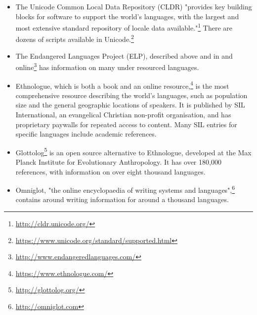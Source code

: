 \begin{itemize}
\item The Unicode Common Local Data Repository (CLDR) "provides key building blocks for software to support the world's languages, with the largest and most extensive standard repository of locale data available."\footnote{\href{http://cldr.unicode.org/}{http://cldr.unicode.org/}} There are dozens of scripts available in Unicode.\footnote{\href{https://www.unicode.org/standard/supported.html}{https://www.unicode.org/standard/supported.html}}

\item The Endangered Languages Project (ELP), described above and in \citet{lee2016assessing} and online\footnote{\href{http://www.endangeredlanguages.com/}{http://www.endangeredlanguages.com/}} has information on many under resourced languages.

\item Ethnologue, which is both a book \citep{lewis2009ethnologue} and an online resource,\footnote{\href{https://www.ethnologue.com/}{https://www.ethnologue.com/}} is the most comprehensive resource describing the world's languages, such as population size and the general geographic locations of speakers. It is published by SIL International, an evangelical Christian non-profit organisation, and has proprietary paywalls for repeated access to content. Many SIL entries for specific languages include academic references.

\item Glottolog\footnote{\href{http://glottolog.org/}{http://glottolog.org/}} is an open source alternative to Ethnologue, developed at the Max Planck Institute for Evolutionary Anthropology. It has over 180,000 references, with information on over eight thousand languages. \citep{hammarstrom2015glottolog}

\item Omniglot, "the online encyclopaedia of writing systems and languages",\footnote{\href{http://omniglot.com}{http://omniglot.com}} contains around writing information for around a thousand languages. \citep{ager2008omniglot}


\end{itemize}
